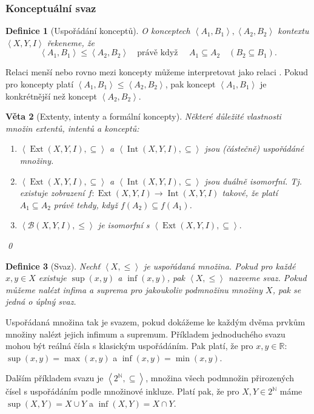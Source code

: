 \documentclass[12pt]{article}
\newcommand{\pravekdyz}{\mbox{právě když }}
\newcommand{\sssection}[1]{\subsubsection{#1}}
\newcommand{\addsp}[1]{\left<#1\right>}
\DeclareMathOperator{\ext}{Ext}
\DeclareMathOperator{\intfca}{Int}
\newcommand{\context}{\addsp{X, Y, I}}
\newcommand{\lattice}{\mathcal{B}(X, Y, I)}
\newtheorem{mydef}{Definice}
\newtheorem{theorem}[mydef]{Věta}
\begin{document}
\sssection{Konceptuální svaz}
\begin{mydef}[Uspořádání konceptů]
\label{def.order}
O konceptech $\addsp{A_1, B_1}, \addsp{A_2, B_2}$ kontextu $\context$ řekeneme, že
$$\addsp{A_1, B_1}\le\addsp{A_2, B_2}\quad\pravekdyz\quad A_1\subseteq A_2 \quad(B_2\subseteq B_1).$$
\end{mydef}

Relaci menší nebo rovno mezi koncepty můžeme interpretovat jako relaci . Pokud pro koncepty platí $\addsp{A_1, B_1}\le\addsp{A_2, B_2}$, pak koncept $\addsp{A_1, B_1}$ je konkrétnější než koncept $\addsp{A_2, B_2}$. 

\begin{theorem}[Extenty, intenty a formální koncepty]Některé důležité vlastnosti množin extentů, intentů a konceptů:
\begin{enumerate}
	\item $\addsp{\ext(X,Y,I), \subseteq}$ a $\addsp{\intfca(X,Y,I), \subseteq}$ jsou (částečně) uspořádáné množiny. 
	\item $\addsp{\ext(X,Y,I), \subseteq}$ a $\addsp{\intfca(X,Y,I), \subseteq}$ jsou duálně isomorfní. Tj. existuje zobrazení $f: \ext(X,Y,I)\rightarrow\intfca(X,Y,I)$ takové, že platí $A_1\subseteq A_2$ právě tehdy, když $f(A_2)\subseteq f(A_1)$.
	\item $\addsp{\lattice, \le}$ je isomorfní s $\addsp{\ext(X,Y,I), \subseteq}.$
\end{enumerate}
\qed\end{theorem}

\begin{mydef}[Svaz]
Nechť $\addsp{X, \le}$ je uspořádaná množina. Pokud pro každé $x,y\in X$ existuje $\sup(x,y)$ a $\inf(x,y)$, pak $\addsp{X, \le}$ nazveme svaz. Pokud můžeme nalézt infima a suprema pro jakoukoliv podmnožinu množiny $X$, pak se jedná o úplný svaz. 
\end{mydef}

Uspořádaná množina tak je svazem, pokud dokážeme ke každým dvěma prvkům množiny nalézt jejich infimum a supremum. Příkladem jednoduchého svazu mohou být reálná čísla s klasickým uspořádáním. Pak platí, že pro $x,y\in\mathbb{R}$: $\sup(x,y)=\max(x,y)$ a $\inf(x,y)=\min(x,y)$.

Dalším příkladem svazu je $\addsp{2^{\mathbb{N}}, \subseteq}$, množina všech podmnožin přirozených čísel s uspořádáním podle množinové inkluze. Platí pak, že pro $X, Y \in 2^{\mathbb{N}}$ máme $\sup(X, Y) = X \cup Y$ a $\inf(X, Y) = X \cap Y$.
\end{document}

